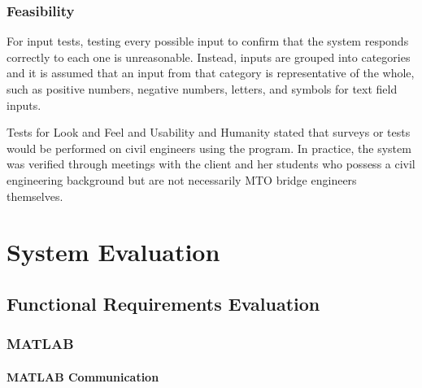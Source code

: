\documentclass[12pt, titlepage]{article}
\begin{document}
\subsubsection{Feasibility}

For input tests, testing every possible input to confirm that the system responds correctly to each one is unreasonable. Instead, inputs are grouped into categories and it is assumed that an input from that category is representative of the whole, such as positive numbers, negative numbers, letters, and symbols for text field inputs.

Tests for Look and Feel and Usability and Humanity stated that surveys or tests would be performed on civil engineers using the program. In practice, the system was verified through meetings with the client and her students who possess a civil engineering background but are not necessarily MTO bridge engineers themselves.

\section{System Evaluation}

\subsection{Functional Requirements Evaluation}

\subsubsection{MATLAB}

\paragraph{MATLAB Communication}
\end{document}

